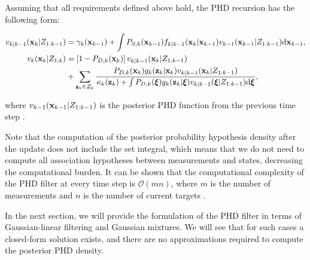 \begin{theorem}
    Assuming that all requirements defined above hold, the PHD recursion has the following form:

    \begin{align}
        v_{k|k-1}(\vecat{x}{k} | Z_{1:k-1})
        &= \gamma_k(\vecat{x}{k-1}) + \int P_{S,k}(\vecat{x}{k-1}) f_{k|k-1}(\vecat{x}{k} | \vecat{x}{k-1}) v_{k-1}(\vecat{x}{k-1} | Z_{1:k-1}) \mathrm{d} \vecat{x}{k-1}, \\
        v_k(\vecat{x}{k} | Z_{1:k})
        &= \left[1-P_{D,k}(\vecat{x}{k})\right] v_{k|k-1}(\vecat{x}{k} | Z_{1:k-1}) \\
        &+ \sum_{\vecat{z}{k} \in Z_k} \frac{
            P_{D,k}(\vecat{x}{k}) g_k(\vecat{z}{k} | \vecat{x}{k}) v_{k|k-1}(\vecat{x}{k} | Z_{1:k-1})
        }{
            \kappa_k(\vecat{z}{k}) + \int P_{D,k}(\boldsymbol{\xi}) g_k(\vecat{z}{k} | \boldsymbol{\xi}) v_{k|k-1}(\boldsymbol{\xi} | Z_{1:k-1}) \mathrm{d} \boldsymbol{\xi}
        },
    \end{align}

    \noindent where $v_{k-1}(\vecat{x}{k-1} | Z_{1:k-1})$ is the posterior PHD function from the previous time step \cite{voGaussianMixtureProbability2006} \cite[588--591]{mahlerStatisticalMultisourcemultitargetInformation2007}.
\end{theorem}

Note that the computation of the posterior probability hypothesis density after the update does not include the set integral, which means that we do not need to compute all association hypotheses between measurements and states, decreasing the computational burden. It can be shown that the computational complexity of the PHD filter at every time step is $\mathcal{O}(mn)$, where $m$ is the number of measurements and $n$ is the number of current targets \cite[592]{mahlerStatisticalMultisourcemultitargetInformation2007}.

In the next section, we will provide the formulation of the PHD filter in terms of Gaussian-linear filtering and Gaussian mixtures. We will see that for such cases a closed-form solution exists, and there are no approximations required to compute the posterior PHD density.
